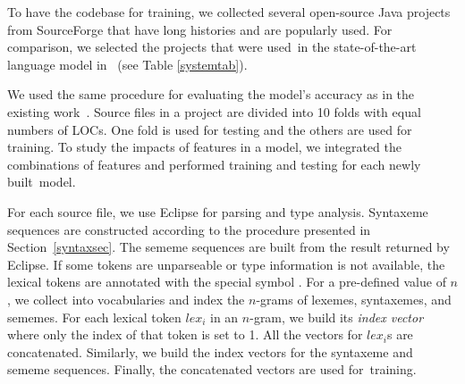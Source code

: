 


To have the codebase for training, we collected several open-source
Java projects from SourceForge that have long histories and are
popularly used. For comparison, we selected the projects that were
used~in the state-of-the-art language model in~\cite{natural} (see Table
{\ref{systemtab}}).

We used the same procedure for evaluating the model's accuracy as in
the existing work~\cite{natural,tu-fse14,fse13}. 
Source files in a project are divided into 10 folds with equal numbers
of LOCs. One fold is used for testing and the others are used for
training. To study the impacts of features in a model, we integrated
the combinations of features and performed training and testing for
each newly built~model.

For each source file,
we use Eclipse for parsing and type analysis.
Syntaxeme sequences are constructed according to the procedure
presented in Section~\ref{syntaxsec}.
The sememe sequences are built from the result returned by Eclipse.
If some tokens are unparseable or type information is not
available, the lexical tokens are annotated with the special
symbol .
%
For a pre-defined value of $n$, we collect into vocabularies and index
the $n$-grams of lexemes, syntaxemes, and sememes. For each lexical
token $lex_i$ in an $n$-gram, we build its {\em index vector} where
only the index of that token is set to 1.
All the vectors for $lex_i$s
are concatenated. Similarly, we build the index vectors for the
syntaxeme and sememe sequences. Finally, the concatenated vectors are
used for~training.

